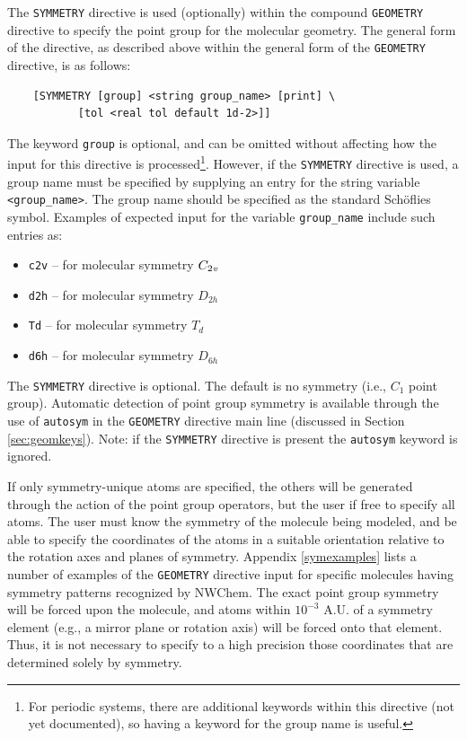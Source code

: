 The \verb+SYMMETRY+ directive is used (optionally) within the compound
\verb+GEOMETRY+ directive to specify the point group for the molecular
geometry. 
The general form of the directive, as described above within the general
form of the \verb+GEOMETRY+ directive, is as follows:
\begin{verbatim}
    [SYMMETRY [group] <string group_name> [print] \
           [tol <real tol default 1d-2>]]
\end{verbatim}
The keyword \verb+group+ is optional, and can be omitted without
affecting how the input for this directive is processed\footnote{For
  periodic systems, there are additional keywords within this
  directive (not yet documented), so having a keyword for the group
  name is useful.}.  However, if the \verb+SYMMETRY+ directive is
used, a group name must be specified by supplying an entry for the
string variable \verb+<group_name>+.  The group name should be
specified as the standard Sch\"{o}flies symbol.  Examples of expected
input for the variable \verb+group_name+ include such entries as:

\begin{itemize}
\item \verb+c2v+ -- for molecular symmetry $C_{2{\it v}}$
\item \verb+d2h+ -- for molecular symmetry $D_{2h}$
\item \verb+Td+ -- for molecular symmetry $T_d$
\item \verb+d6h+ -- for molecular symmetry $D_{6h}$
\end{itemize}

The \verb+SYMMETRY+ directive is optional.  The default is no symmetry 
(i.e., $C_1$ point group). Automatic detection of point
group symmetry is available through the use of \verb+autosym+ in the
\verb+GEOMETRY+ directive main line (discussed in Section \ref{sec:geomkeys}).
Note: if the \verb+SYMMETRY+ directive is present the \verb+autosym+
keyword is ignored.

If only symmetry-unique atoms are specified, the others will be
generated through the action of the point group operators, but the
user if free to specify all atoms.  The user must know the symmetry of
the molecule being modeled, and be able to specify the coordinates of
the atoms in a suitable orientation relative to the rotation axes and
planes of symmetry.  Appendix \ref{symexamples} lists a number of
examples of the
\verb+GEOMETRY+ directive input for specific molecules having symmetry
patterns recognized by NWChem.  The exact point group symmetry will be
forced upon the molecule, and atoms within $10^{-3}$ A.U. of a
symmetry element (e.g., a mirror plane or rotation axis) will be
forced onto that element.  Thus, it is not necessary to specify to a
high precision those coordinates that are determined solely by
symmetry.

